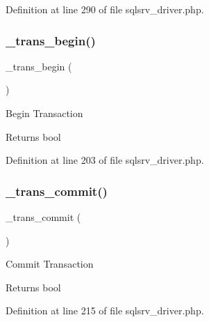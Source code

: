 Definition at line 290 of file sqlsrv\+\_\+driver.\+php.

\mbox{\label{class_c_i___d_b__sqlsrv__driver_ac81ac882c1d54347d810199a15856aac}} 
\subsubsection{\texorpdfstring{\_trans\_begin()}{\_trans\_begin()}}
{\footnotesize\ttfamily \+\_\+trans\+\_\+begin (\begin{DoxyParamCaption}{ }\end{DoxyParamCaption})\hspace{0.3cm}{\ttfamily [protected]}}

Begin Transaction

\begin{DoxyReturn}{Returns}
bool 
\end{DoxyReturn}


Definition at line 203 of file sqlsrv\+\_\+driver.\+php.

\mbox{\label{class_c_i___d_b__sqlsrv__driver_a6fe7f373e0b11cfae23a5f41c0b35dda}} 
\subsubsection{\texorpdfstring{\_trans\_commit()}{\_trans\_commit()}}
{\footnotesize\ttfamily \+\_\+trans\+\_\+commit (\begin{DoxyParamCaption}{ }\end{DoxyParamCaption})\hspace{0.3cm}{\ttfamily [protected]}}

Commit Transaction

\begin{DoxyReturn}{Returns}
bool 
\end{DoxyReturn}


Definition at line 215 of file sqlsrv\+\_\+driver.\+php.

\mbox{\label{class_c_i___d_b__sqlsrv__driver_ad49a116b0776c26b53114c9093fd102a}} 
